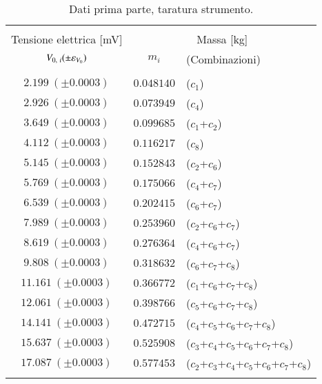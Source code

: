 \begin{table}
    \footnotesize
    \centering
    \caption{Dati prima parte, taratura strumento.}
    \label{table:p1}
    \begin{tabular}{ccl}
        \hline\hline\\[-1.5ex]
        Tensione elettrica [mV]      & \multicolumn{2}{c}{Massa [kg]}                \\[+0.5ex]
        $V_{0,~i}(\pm\varepsilon_{V_0})$ & $m_i$      &  (Combinazioni)                  \\[+0.5ex] \hline \\[-1.5ex]
        $ 2.199~(\pm0.0003)$         & $0.048140$ &  ($c_1$)                         \\[+0.5ex]
        $ 2.926~(\pm0.0003)$         & $0.073949$ &  ($c_4$)                         \\[+0.5ex]
        $ 3.649~(\pm0.0003)$         & $0.099685$ &  ($c_1$+$c_2$)                     \\[+0.5ex]
        $ 4.112~(\pm0.0003)$         & $0.116217$ &  ($c_8$)                         \\[+0.5ex]
        $ 5.145~(\pm0.0003)$         & $0.152843$ &  ($c_2$+$c_6$)                     \\[+0.5ex]
        $ 5.769~(\pm0.0003)$         & $0.175066$ &  ($c_4$+$c_7$)                     \\[+0.5ex]
        $ 6.539~(\pm0.0003)$         & $0.202415$ &  ($c_6$+$c_7$)                     \\[+0.5ex]
        $ 7.989~(\pm0.0003)$         & $0.253960$ &  ($c_2$+$c_6$+$c_7$)                 \\[+0.5ex]
        $ 8.619~(\pm0.0003)$         & $0.276364$ &  ($c_4$+$c_6$+$c_7$)                 \\[+0.5ex]
        $ 9.808~(\pm0.0003)$         & $0.318632$ &  ($c_6$+$c_7$+$c_8$)                 \\[+0.5ex]
        $11.161~(\pm0.0003)$         & $0.366772$ &  ($c_1$+$c_6$+$c_7$+$c_8$)             \\[+0.5ex]
        $12.061~(\pm0.0003)$         & $0.398766$ &  ($c_5$+$c_6$+$c_7$+$c_8$)             \\[+0.5ex]
        $14.141~(\pm0.0003)$         & $0.472715$ &  ($c_4$+$c_5$+$c_6$+$c_7$+$c_8$)         \\[+0.5ex]
        $15.637~(\pm0.0003)$         & $0.525908$ &  ($c_3$+$c_4$+$c_5$+$c_6$+$c_7$+$c_8$)     \\[+0.5ex]
        $17.087~(\pm0.0003)$         & $0.577453$ &  ($c_2$+$c_3$+$c_4$+$c_5$+$c_6$+$c_7$+$c_8$) \\[+0.5ex] \hline \\[-1.5ex]
    \end{tabular}
\end{table}